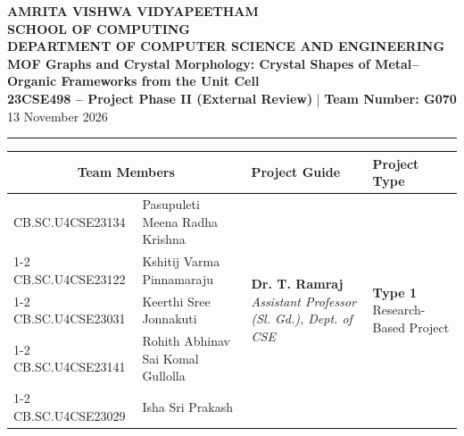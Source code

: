 \documentclass[11pt, a4paper]{article}
\begin{document}
\noindent
\begin{minipage}{\textwidth}
    \centering
    {\Large \textbf{\textcolor{amritaMaroon}{
    AMRITA VISHWA VIDYAPEETHAM \\
    SCHOOL OF COMPUTING \\
    DEPARTMENT OF COMPUTER SCIENCE AND ENGINEERING \\
    }}}
    \vspace{0.2cm}
    {\large \textbf{MOF Graphs and Crystal Morphology: Crystal Shapes of Metal--Organic Frameworks from the Unit Cell}} \\[0.1cm]
    \textbf{23CSE498 -- Project Phase II (External Review)} \quad | \quad \textbf{Team Number: G070} \\
    13 November 2026
\end{minipage}

\vspace{0.3cm}
\hrule
\vspace{0.3cm}

\noindent
\begin{center}
    \renewcommand{\arraystretch}{1.4}
    \setlength{\tabcolsep}{6pt}
    \begin{tabular}{|l|p{4.6cm}|p{4.3cm}|p{3.0cm}|}
        \hline
        \multicolumn{2}{|c|}{\textbf{Team Members}} & \textbf{Project Guide} & \textbf{Project Type} \\
        \hline
        \small CB.SC.U4CSE23134 & \small \raggedright Pasupuleti Meena Radha Krishna &
        \multirow{5}{=}{\raggedright \small \textbf{Dr. T. Ramraj} \newline \textit{Assistant Professor (Sl. Gd.), \newline Dept. of CSE}} &
        \multirow{5}{=}{\raggedright \small \textbf{Type 1} \newline Research-Based Project} \\ \cline{1-2}
        \small CB.SC.U4CSE23122 & \small Kshitij Varma Pinnamaraju & & \\ \cline{1-2}
        \small CB.SC.U4CSE23031 & \small Keerthi Sree Jonnakuti & & \\ \cline{1-2}
        \small CB.SC.U4CSE23141 & \small Rohith Abhinav Sai Komal Gullolla & & \\ \cline{1-2}
        \small CB.SC.U4CSE23029 & \small Isha Sri Prakash & & \\
        \hline
    \end{tabular}
\end{center}
\vspace{0.1cm}
\end{document}
